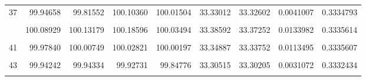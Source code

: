 \documentclass[a4paper]{tufte-handout}
\begin{document}
\begin{table}
{\begin{tabular}[t]{rrrrrrrrr}
37 & 99.94658 & 99.81552 & 100.10360 & 100.01504 & 33.33012 & 33.32602 & 0.0041007 & 0.3334793\\
\cellcolor{gray!6}{38} & \cellcolor{gray!6}{100.04696} & \cellcolor{gray!6}{100.11784} & \cellcolor{gray!6}{100.02709} & \cellcolor{gray!6}{100.12850} & \cellcolor{gray!6}{33.36266} & \cellcolor{gray!6}{33.36372} & \cellcolor{gray!6}{-0.0010547} & \cellcolor{gray!6}{0.3334700}\\
\addlinespace
39 & 100.08929 & 100.13179 & 100.18596 & 100.03494 & 33.38592 & 33.37252 & 0.0133982 & 0.3335614\\
\cellcolor{gray!6}{40} & \cellcolor{gray!6}{100.04294} & \cellcolor{gray!6}{99.96954} & \cellcolor{gray!6}{99.94056} & \cellcolor{gray!6}{100.08237} & \cellcolor{gray!6}{33.32970} & \cellcolor{gray!6}{33.33250} & \cellcolor{gray!6}{-0.0027918} & \cellcolor{gray!6}{0.3331540}\\
41 & 99.97840 & 100.00749 & 100.02821 & 100.00197 & 33.34887 & 33.33752 & 0.0113495 & 0.3335607\\
\cellcolor{gray!6}{42} & \cellcolor{gray!6}{99.96526} & \cellcolor{gray!6}{99.92862} & \cellcolor{gray!6}{99.92791} & \cellcolor{gray!6}{99.98663} & \cellcolor{gray!6}{33.31896} & \cellcolor{gray!6}{33.31591} & \cellcolor{gray!6}{0.0030531} & \cellcolor{gray!6}{0.3333054}\\
43 & 99.94242 & 99.94334 & 99.92731 & 99.84776 & 33.30515 & 33.30205 & 0.0031072 & 0.3332434\\
\addlinespace
\cellcolor{gray!6}{44} & \cellcolor{gray!6}{99.96083} & \cellcolor{gray!6}{99.92636} & \cellcolor{gray!6}{100.01802} & \cellcolor{gray!6}{100.00641} & \cellcolor{gray!6}{33.31566} & \cellcolor{gray!6}{33.32787} & \cellcolor{gray!6}{-0.0122018} & \cellcolor{gray!6}{0.3332872}\\
\bottomrule
\end{tabular}}
\end{table}
\end{document}
